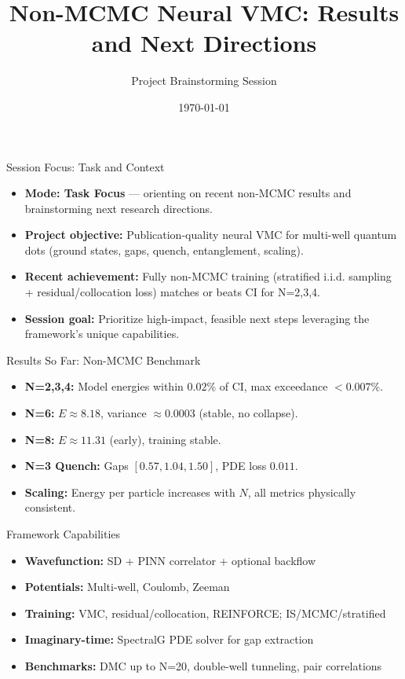 \documentclass{beamer}
\title{Non-MCMC Neural VMC: Results and Next Directions}
\author{Project Brainstorming Session}
\date{\today}
\begin{document}
\begin{frame}
  \titlepage
\end{frame}

\begin{frame}{Session Focus: Task and Context}
\begin{itemize}
  \item \textbf{Mode: Task Focus} — orienting on recent non-MCMC results and brainstorming next research directions.
  \item \textbf{Project objective:} Publication-quality neural VMC for multi-well quantum dots (ground states, gaps, quench, entanglement, scaling).
  \item \textbf{Recent achievement:} Fully non-MCMC training (stratified i.i.d. sampling + residual/collocation loss) matches or beats CI for N=2,3,4.
  \item \textbf{Session goal:} Prioritize high-impact, feasible next steps leveraging the framework's unique capabilities.
\end{itemize}
\end{frame}

\begin{frame}{Results So Far: Non-MCMC Benchmark}
\begin{itemize}
  \item \textbf{N=2,3,4:} Model energies within $0.02\%$ of CI, max exceedance $<0.007\%$.
  \item \textbf{N=6:} $E \approx 8.18$, variance $\approx 0.0003$ (stable, no collapse).
  \item \textbf{N=8:} $E \approx 11.31$ (early), training stable.
  \item \textbf{N=3 Quench:} Gaps $[0.57, 1.04, 1.50]$, PDE loss $0.011$.
  \item \textbf{Scaling:} Energy per particle increases with $N$, all metrics physically consistent.
\end{itemize}
\end{frame}

\begin{frame}{Framework Capabilities}
\begin{itemize}
  \item \textbf{Wavefunction:} SD + PINN correlator + optional backflow
  \item \textbf{Potentials:} Multi-well, Coulomb, Zeeman
  \item \textbf{Training:} VMC, residual/collocation, REINFORCE; IS/MCMC/stratified
  \item \textbf{Imaginary-time:} SpectralG PDE solver for gap extraction
  \item \textbf{Benchmarks:} DMC up to N=20, double-well tunneling, pair correlations
\end{itemize}
\end{frame}
\end{document}
